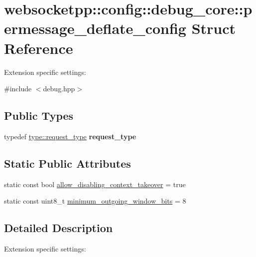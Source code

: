 \hypertarget{structwebsocketpp_1_1config_1_1debug__core_1_1permessage__deflate__config}{}\section{websocketpp\+:\+:config\+:\+:debug\+\_\+core\+:\+:permessage\+\_\+deflate\+\_\+config Struct Reference}
\label{structwebsocketpp_1_1config_1_1debug__core_1_1permessage__deflate__config}


Extension specific settings\+:  




{\ttfamily \#include $<$debug.\+hpp$>$}

\subsection*{Public Types}
\begin{DoxyCompactItemize}
\item 
\mbox{\label{structwebsocketpp_1_1config_1_1debug__core_1_1permessage__deflate__config_aaf933a304bf66b1bdf5bec33fdf013a8}} 
typedef \mbox{\hyperlink{classwebsocketpp_1_1http_1_1parser_1_1request}{type\+::request\+\_\+type}} {\bfseries request\+\_\+type}
\end{DoxyCompactItemize}
\subsection*{Static Public Attributes}
\begin{DoxyCompactItemize}
\item 
static const bool \mbox{\hyperlink{structwebsocketpp_1_1config_1_1debug__core_1_1permessage__deflate__config_a2c214b49d880b8ca1ebcce9c92d1dec6}{allow\+\_\+disabling\+\_\+context\+\_\+takeover}} = true
\item 
static const uint8\+\_\+t \mbox{\hyperlink{structwebsocketpp_1_1config_1_1debug__core_1_1permessage__deflate__config_ae9ce7b9a7a002339d80dca046e940867}{minimum\+\_\+outgoing\+\_\+window\+\_\+bits}} = 8
\end{DoxyCompactItemize}


\subsection{Detailed Description}
Extension specific settings\+: 

